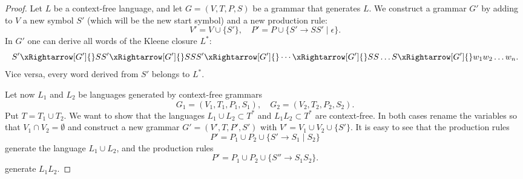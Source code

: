 

\setcounter{section}{7}
\setcounter{subsection}{1}
\setcounter{dfn}{1}


\begin{proof}
Let $L$ be a context-free language, and let $G = (V, T, P, S)$ be a grammar that generates $L$.
We construct a grammar $G'$ by adding to $V$ a new symbol $S'$ (which will be the new start symbol) and a new production rule:
\[
V' = V \cup \{S'\}, \quad P' = P \cup \{S' \to SS' \mid \epsilon\}.
\]
In $G'$ one can derive all words of the Kleene closure $L^*$:
\[
S' \xRightarrow[G']{} SS' \xRightarrow[G']{} SSS' \xRightarrow[G']{} \cdots \xRightarrow[G']{} SS \ldots S \xRightarrow[G']{} w_1 w_2 \ldots w_n.
\]
Vice versa, every word derived from $S'$ belongs to $L^*$.

Let now $L_1$ and $L_2$ be languages generated by context-free grammars
\[
G_1 = (V_1, T_1, P_1, S_1), \quad G_2 = (V_2, T_2, P_2, S_2).
\]
Put $T = T_1 \cup T_2$.
We want to show that the languages $L_1 \cup L_2 \subset T^*$ and $L_1L_2 \subset T^*$ are context-free.
In both cases rename the variables so that $V_1 \cap V_2 = \emptyset$
and construct a new grammar $G' = (V', T, P', S')$ with $V' = V_1 \cup V_2 \cup \{S'\}$.
It is easy to see that the production rules
\[
P' = P_1 \cup P_2 \cup \{S' \to S_1 \mid S_2\}
\]
generate the language $L_1 \cup L_2$,
and the production rules
\[
P' = P_1 \cup P_2 \cup \{S'' \to S_1S_2\}.
\]
generate $L_1L_2$.
\end{proof}




